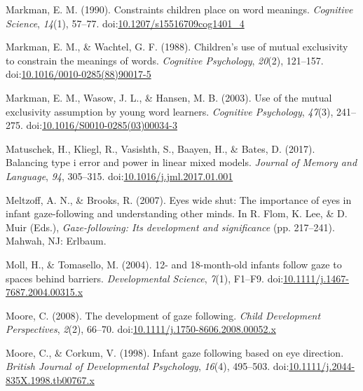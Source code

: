 \documentclass[,man,floatsintext]{apa6}
\begin{document}
\leavevmode\hypertarget{ref-Markman_1990}{}%
Markman, E. M. (1990). Constraints children place on word meanings. \emph{Cognitive Science}, \emph{14}(1), 57--77. doi:\href{https://doi.org/10.1207/s15516709cog1401_4}{10.1207/s15516709cog1401\_4}

\leavevmode\hypertarget{ref-Markman_Wachtel_1988}{}%
Markman, E. M., \& Wachtel, G. F. (1988). Children's use of mutual exclusivity to constrain the meanings of words. \emph{Cognitive Psychology}, \emph{20}(2), 121--157. doi:\href{https://doi.org/10.1016/0010-0285(88)90017-5}{10.1016/0010-0285(88)90017-5}

\leavevmode\hypertarget{ref-Markman_etal_2003}{}%
Markman, E. M., Wasow, J. L., \& Hansen, M. B. (2003). Use of the mutual exclusivity assumption by young word learners. \emph{Cognitive Psychology}, \emph{47}(3), 241--275. doi:\href{https://doi.org/10.1016/S0010-0285(03)00034-3}{10.1016/S0010-0285(03)00034-3}

\leavevmode\hypertarget{ref-Matuschek_etal_2017}{}%
Matuschek, H., Kliegl, R., Vasishth, S., Baayen, H., \& Bates, D. (2017). Balancing type i error and power in linear mixed models. \emph{Journal of Memory and Language}, \emph{94}, 305--315. doi:\href{https://doi.org/10.1016/j.jml.2017.01.001}{10.1016/j.jml.2017.01.001}

\leavevmode\hypertarget{ref-Meltzoff_Brooks_2007}{}%
Meltzoff, A. N., \& Brooks, R. (2007). Eyes wide shut: The importance of eyes in infant gaze-following and understanding other minds. In R. Flom, K. Lee, \& D. Muir (Eds.), \emph{Gaze-following: Its development and significance} (pp. 217--241). Mahwah, NJ: Erlbaum.

\leavevmode\hypertarget{ref-Moll_Tomasello_2004}{}%
Moll, H., \& Tomasello, M. (2004). 12- and 18-month-old infants follow gaze to spaces behind barriers. \emph{Developmental Science}, \emph{7}(1), F1--F9. doi:\href{https://doi.org/10.1111/j.1467-7687.2004.00315.x}{10.1111/j.1467-7687.2004.00315.x}

\leavevmode\hypertarget{ref-Moore_2008}{}%
Moore, C. (2008). The development of gaze following. \emph{Child Development Perspectives}, \emph{2}(2), 66--70. doi:\href{https://doi.org/10.1111/j.1750-8606.2008.00052.x}{10.1111/j.1750-8606.2008.00052.x}

\leavevmode\hypertarget{ref-Moore_Corkum_1998}{}%
Moore, C., \& Corkum, V. (1998). Infant gaze following based on eye direction. \emph{British Journal of Developmental Psychology}, \emph{16}(4), 495--503. doi:\href{https://doi.org/10.1111/j.2044-835X.1998.tb00767.x}{10.1111/j.2044-835X.1998.tb00767.x}
\end{document}
